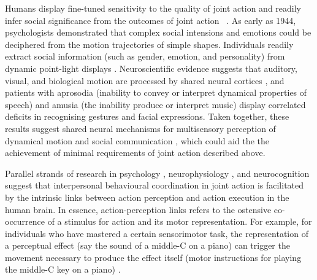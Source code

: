 \begin{CJK}{UTF8}{gbsn}
Humans display fine-tuned sensitivity to the quality of joint action and readily infer social significance from the outcomes of joint action ~\citep{Wheatley2016}.  As early as 1944, psychologists \textcite{Heider1944} demonstrated that complex social intensions and emotions could be deciphered from the motion trajectories of simple shapes.  Individuals readily extract social information (such as gender, emotion, and personality) from dynamic point-light displays \citep{Atkinson2004,Clark2005a,Johansson1973}.  Neuroscientific evidence suggests that auditory, visual, and biological motion
are processed by shared neural cortices \citep[e.g., the right superior temporal cortex; see][]{Zatorre2007,Beaucousin2007,Beauchamp2007}, and patients with aprosodia (inability to convey or interpret dynamical properties of speech) and amusia (the inability produce or interpret music) display correlated deficits in recognising gestures and facial expressions.  Taken together, these results suggest shared neural mechanisms for multisensory perception of dynamical motion and social communication \citep{Wheatley2012,Wheatley2016}, which could aid the the achievement of minimal requirements of joint action described above.




Parallel strands of research in psychology \citep{Prinz1990,Prinz1997,Prinz2013}, neurophysiology \citep{Rizzolatti2004,Rizzolatti2010}, and neurocognition \citep{Wolpert1998,Wolpert2000} suggest that interpersonal behavioural coordination in joint action is facilitated by the intrinsic links between action perception and action execution in the human brain.  In essence, action-perception links refers to the ostensive co-occurrence of a stimulus for action and its motor representation.  For example, for individuals who have mastered a certain sensorimotor task, the representation of a perceptual effect (say the sound of a middle-C on a piano) can trigger the movement necessary to produce the effect itself (motor instructions for playing the middle-C key on a piano) \citep{Novembre2014}.


\end{CJK}
